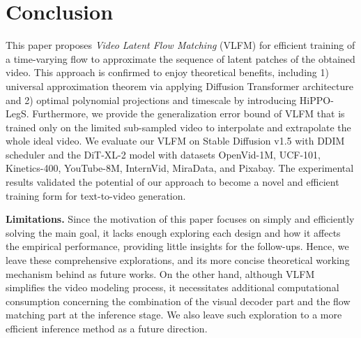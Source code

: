 \section{Conclusion} \label{sec:conclusion}

This paper proposes {\it Video Latent Flow Matching} (VLFM) for efficient training of a time-varying flow to approximate the sequence of latent patches of the obtained video. This approach is confirmed to enjoy theoretical benefits, including 1) universal approximation theorem via applying Diffusion Transformer architecture and 2) optimal polynomial projections and timescale by introducing HiPPO-LegS. Furthermore, we provide the generalization error bound of VLFM that is trained only on the limited sub-sampled video to interpolate and extrapolate the whole ideal video. We evaluate our VLFM on Stable Diffusion v1.5 with DDIM scheduler and the DiT-XL-2 model with datasets OpenVid-1M,
UCF-101,
Kinetics-400,
YouTube-8M,
InternVid,
MiraData, and
Pixabay. The experimental results validated the potential of our approach to become a novel and efficient training form for text-to-video generation.

{\bf Limitations. } Since the motivation of this paper focuses on simply and efficiently solving the main goal, it lacks enough exploring each design and how it affects the empirical performance, providing little insights for the follow-ups. Hence, we leave these comprehensive explorations, and its more concise theoretical working mechanism behind as future works. On the other hand, although VLFM simplifies the video modeling process, it necessitates additional computational consumption concerning the combination of the visual decoder part and the flow matching part at the inference stage. We also leave such exploration to a more efficient inference method as a future direction.